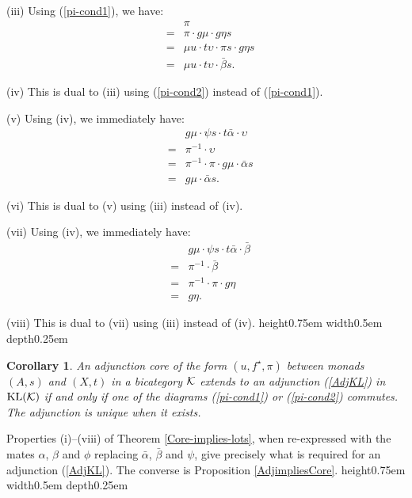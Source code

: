 \documentclass[a4paper,10pt]{article}
\newcommand{\qed}{\nobreak \ifvmode \relax \else
      \ifdim\lastskip<1.5em \hskip-\lastskip
      \hskip1.5em plus0em minus0.5em \fi \nobreak
      \vrule height0.75em width0.5em depth0.25em\fi}
\newtheorem{corollary}[theorem]{Corollary}
\newenvironment{proof}[1][Proof]{\begin{trivlist}
\item[\hskip \labelsep {\bfseries #1}]}{\end{trivlist}}
\newcommand{\bk}{{\cal{K}}}
\numberwithin{equation}{section}
\begin{document}
\begin{proof}
(iii) Using (\ref{pi-cond1}), we have:
\begin{eqnarray*}
&& \pi \\
& = & \pi \cdot g \mu \cdot g \eta s \\
& = &  \mu u \cdot t \upsilon \cdot \pi s \cdot g \eta s \\
& = &  \mu u \cdot t \upsilon \cdot \bar{\beta} s .
\end{eqnarray*}

(iv) This is dual to (iii) using (\ref{pi-cond2}) instead of (\ref{pi-cond1}). 

(v) Using (iv), we immediately have:
\begin{eqnarray*}
&& g \mu \cdot \psi s \cdot t \bar{\alpha} \cdot \upsilon \\
& = & \pi^{-1} \cdot \upsilon \\
& = & \pi^{-1} \cdot \pi \cdot g \mu \cdot \bar{\alpha} s \\
& = & g \mu \cdot \bar{\alpha} s .
\end{eqnarray*}

(vi) This is dual to (v) using (iii) instead of (iv).

(vii) Using (iv), we immediately have:
\begin{eqnarray*}
&& g \mu \cdot \psi s \cdot t \bar{\alpha} \cdot \bar{\beta} \\
& = & \pi^{-1} \cdot \bar{\beta} \\
& = & \pi^{-1} \cdot \pi \cdot g \eta \\
& = & g \eta .
\end{eqnarray*}

(viii) This is dual to (vii) using (iii) instead of (iv).   \qed

\end{proof}

\begin{corollary} \label{KLCoreThm}
An adjunction core of the form $(u,f^{\star},\pi)$ between monads $(A,s)$ and $(X,t)$ in a bicategory $\bk$  extends to an adjunction (\ref{AdjKL}) in $\mathrm{KL}(\bk)$ if and only if one of the diagrams (\ref{pi-cond1}) or (\ref{pi-cond2}) commutes. The adjunction is unique when it exists.
\end{corollary}

\begin{proof} 
Properties (i)--(viii) of Theorem \ref{Core-implies-lots}, when re-expressed with the mates $\alpha$, $\beta$ and $\phi$ replacing  $\bar{\alpha}$, $\bar{\beta}$ and $\psi$, give precisely what is required for an adjunction (\ref{AdjKL}). The converse is Proposition \ref{AdjimpliesCore}.  \qed
\end{proof}
\end{document}
